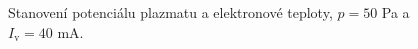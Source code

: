 \documentclass[a4paper,12pt]{article}
\begin{document}
\newpage
\begin{figure}[h]
	\centering
	\begin{subfigure}[b]{.49\textwidth}
		\centering
	\end{subfigure}
	\begin{subfigure}[b]{.49\textwidth}
		\centering
	\end{subfigure}
	\caption{Stanovení potenciálu plazmatu a elektronové teploty, $p = 50$ \si{\pascal} a $I_\text{v} = 40$ \si{\milli\ampere}.}
	\label{data4}
\end{figure}
\end{document}
